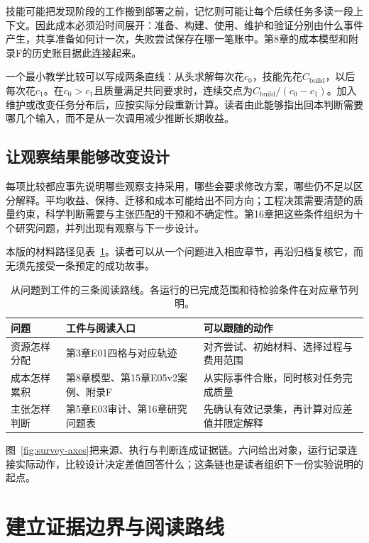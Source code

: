 技能可能把发现阶段的工作搬到部署之前，记忆则可能让每个后续任务多读一段上下文。因此成本必须沿时间展开：准备、构建、使用、维护和验证分别由什么事件产生，共享准备如何计一次，失败尝试保存在哪一笔账中。第8章的成本模型和附录F的历史账目据此连接起来。

一个最小教学比较可以写成两条直线：从头求解每次花$c_0$，技能先花$C_{\mathrm{build}}$，以后每次花$c_1$。在$c_0>c_1$且质量满足共同要求时，连续交点为$C_{\mathrm{build}}/(c_0-c_1)$。加入维护或改变任务分布后，应按实际分段重新计算。读者由此能够指出回本判断需要哪几个输入，而不是从一次调用减少推断长期收益。

\subsection{让观察结果能够改变设计}

每项比较都应事先说明哪些观察支持采用，哪些会要求修改方案，哪些仍不足以区分解释。平均收益、保持、迁移和成本可能给出不同方向；工程决策需要清楚的质量约束，科学判断需要与主张匹配的干预和不确定性。第16章把这些条件组织为十个研究问题，并列出现有观察与下一步设计。

本版的材料路径见表~\ref{tab:three}。读者可以从一个问题进入相应章节，再沿归档复核它，而无须先接受一条预定的成功故事。

\begin{table}[htbp]
\centering\small
\begin{tabular}{@{}p{2.6cm}p{4.8cm}p{5.8cm}@{}}
\toprule
问题 & 工件与阅读入口 & 可以跟随的动作 \\
\midrule
资源怎样分配 & 第3章E01四格与对应轨迹 & 对齐尝试、初始材料、选择过程与费用范围 \\
成本怎样累积 & 第8章模型、第15章E05v2案例、附录F & 从实际事件合账，同时核对任务完成质量 \\
主张怎样判断 & 第5章E03审计、第16章研究问题表 & 先确认有效记录集，再计算对应差值并限定解释 \\
\bottomrule
\end{tabular}
\caption{从问题到工件的三条阅读路线。各运行的已完成范围和待检验条件在对应章节列明。}
\label{tab:three}
\end{table}



图~\ref{fig:survey-axes}把来源、执行与判断连成证据链。六问给出对象，运行记录连接实际动作，比较设计决定差值回答什么；这条链也是读者组织下一份实验说明的起点。

\section{建立证据边界与阅读路线}
\label{sec:boundaries}


